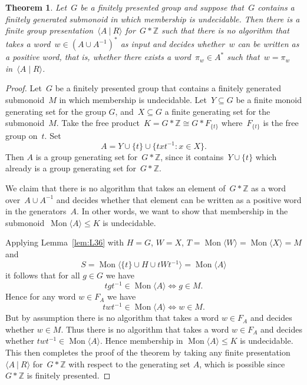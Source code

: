 \documentclass[11pt]{amsart}
\newcommand{\Mgen}[1]{\operatorname{Mon}\bigl\langle #1 \bigr\rangle}
\newcommand{\Gpres}[2]{\bigl\langle #1\:|\:#2 \bigr\rangle}
\newcommand{\Z}{\mathbb{Z}}
\theoremstyle{plain}
\newtheorem{theorem}{Theorem}[section]
\theoremstyle{definition}
\begin{document}
\begin{theorem}\label{thm:positivity:fails:in:general}
Let~$G$ be a finitely presented group and suppose that~$G$ contains a finitely generated submonoid in which membership is undecidable. Then there is a finite group presentation~$\Gpres{A}{R}$ for~$G \ast \Z$ such that there is no algorithm that takes a word~$w \in (A \cup A^{-1})^*$ as input and decides whether~$w$ can be written as a positive word, that is, whether there exists a word~$\pi_w \in A^*$ such that~$w=\pi_w$ in~$\langle A \mid R \rangle$.     
\end{theorem}
\begin{proof} 
Let~$G$ be a finitely presented group that contains a finitely generated submonoid~$M$ in which membership is undecidable. Let~$Y \subseteq G$ be a finite monoid generating set for the group $G$, and~$X \subseteq G$ a finite generating set for the submonoid~$M$. Take the free product~$K = G \ast \Z \cong G \ast F_{\{ t \} }$ where~$F_{\{ t \} }$ is the free group on~$t$. Set 
\[
A = Y \cup \{t\} \cup \{txt^{-1} : x \in X \}.
\]
Then $A$ is a group generating set for~$G \ast \Z$, since it contains~$Y \cup \{t\}$ which already is a group generating set for~$G \ast \Z$. 

We claim that there is no algorithm that takes an element of~$G \ast \Z$ as a word over~$A \cup A^{-1}$ and decides whether that element can be written as a positive word in the generators~$A$. 
In other words, we want to show that 
membership in the submonoid~$\Mgen{A} \leq K$ is undecidable. 

Applying Lemma~\ref{lem:L36} with $H=G$, $W = X$, $T = \Mgen{W} = \Mgen{X} = M$ and
\[
S = \Mgen{\{t\} \cup H \cup tWt^{-1}} = \Mgen{A}  
\]
it follows that for all $g \in G$ we have 
\[
tgt^{-1} \in \Mgen{A} \Leftrightarrow g \in M. 
\] 
Hence for any word $w \in F_A$ we have    
\[
twt^{-1} \in \Mgen{A} \Leftrightarrow w \in M. 
\]
But by assumption there is no algorithm that takes a word $w \in F_A$ and decides whether $w \in M$. Thus there is no algorithm that takes a word $w \in F_A$ and decides whether $twt^{-1} \in \Mgen{A}$. Hence membership in    
$\Mgen{A} \leq K$ is undecidable. 
This then completes the proof of the theorem by taking any finite presentation  
$\Gpres{A}{R}$ for~$G \ast \Z$ with respect to the generating set $A$, which is possible since  
$G \ast \Z$ is finitely presented. 
\end{proof}
\end{document}
